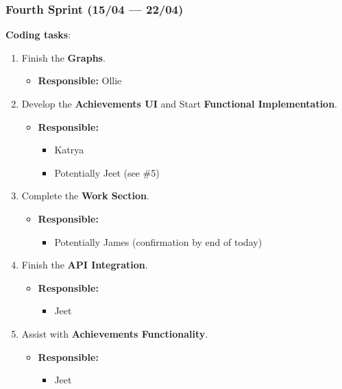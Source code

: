 \documentclass[12pt]{article}
\begin{document}
\hypertarget{fourth-sprint-1504-2204}{%
\subsubsection{Fourth Sprint (15/04 ---
22/04)}\label{fourth-sprint-1504-2204}}

\textbf{Coding tasks}:

\begin{enumerate}
\def\labelenumi{\arabic{enumi}.}
\tightlist
\item
  Finish the \textbf{Graphs}.

  \begin{itemize}
  \tightlist
  \item
    \textbf{Responsible:} Ollie
  \end{itemize}
\item
  Develop the \textbf{Achievements UI} and Start \textbf{Functional
  Implementation}.

  \begin{itemize}
  \tightlist
  \item
    \textbf{Responsible:}

    \begin{itemize}
    \tightlist
    \item
      Katrya
    \item
      Potentially Jeet (see \#5)
    \end{itemize}
  \end{itemize}
\item
  Complete the \textbf{Work Section}.

  \begin{itemize}
  \tightlist
  \item
    \textbf{Responsible:}

    \begin{itemize}
    \tightlist
    \item
      Potentially James (confirmation by end of today)
    \end{itemize}
  \end{itemize}
\item
  Finish the \textbf{API Integration}.

  \begin{itemize}
  \tightlist
  \item
    \textbf{Responsible:}

    \begin{itemize}
    \tightlist
    \item
      Jeet
    \end{itemize}
  \end{itemize}
\item
  Assist with \textbf{Achievements Functionality}.

  \begin{itemize}
  \tightlist
  \item
    \textbf{Responsible:}

    \begin{itemize}
    \tightlist
    \item
      Jeet
    \end{itemize}
  \end{itemize}
\end{enumerate}
\end{document}
